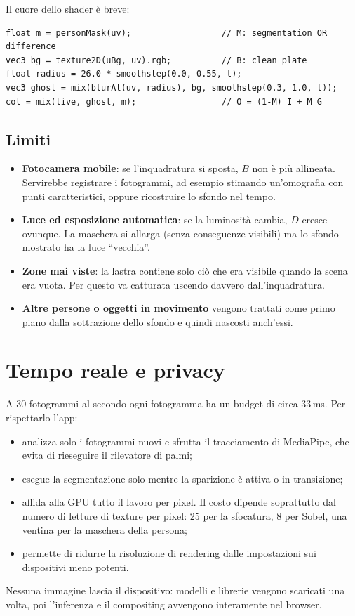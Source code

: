 \documentclass[11pt,a4paper]{article}
\begin{document}
Il cuore dello shader è breve:
\begin{lstlisting}
float m = personMask(uv);                  // M: segmentation OR difference
vec3 bg = texture2D(uBg, uv).rgb;          // B: clean plate
float radius = 26.0 * smoothstep(0.0, 0.55, t);
vec3 ghost = mix(blurAt(uv, radius), bg, smoothstep(0.3, 1.0, t));
col = mix(live, ghost, m);                 // O = (1-M) I + M G
\end{lstlisting}

\subsection{Limiti}
\begin{itemize}
  \item \textbf{Fotocamera mobile}: se l'inquadratura si sposta, $B$ non è più allineata. Servirebbe
  registrare i fotogrammi, ad esempio stimando un'omografia con punti caratteristici, oppure
  ricostruire lo sfondo nel tempo.
  \item \textbf{Luce ed esposizione automatica}: se la luminosità cambia, $D$ cresce ovunque. La
  maschera si allarga (senza conseguenze visibili) ma lo sfondo mostrato ha la luce ``vecchia''.
  \item \textbf{Zone mai viste}: la lastra contiene solo ciò che era visibile quando la scena era
  vuota. Per questo va catturata uscendo davvero dall'inquadratura.
  \item \textbf{Altre persone o oggetti in movimento} vengono trattati come primo piano dalla
  sottrazione dello sfondo e quindi nascosti anch'essi.
\end{itemize}

\section{Tempo reale e privacy}

A 30 fotogrammi al secondo ogni fotogramma ha un budget di circa 33\,ms. Per rispettarlo l'app:
\begin{itemize}
  \item analizza solo i fotogrammi nuovi e sfrutta il tracciamento di MediaPipe, che evita di
  rieseguire il rilevatore di palmi;
  \item esegue la segmentazione solo mentre la sparizione è attiva o in transizione;
  \item affida alla GPU tutto il lavoro per pixel. Il costo dipende soprattutto dal numero di
  letture di texture per pixel: 25 per la sfocatura, 8 per Sobel, una ventina per la maschera
  della persona;
  \item permette di ridurre la risoluzione di rendering dalle impostazioni sui dispositivi meno
  potenti.
\end{itemize}
Nessuna immagine lascia il dispositivo: modelli e librerie vengono scaricati una volta, poi
l'inferenza e il compositing avvengono interamente nel browser.
\end{document}
